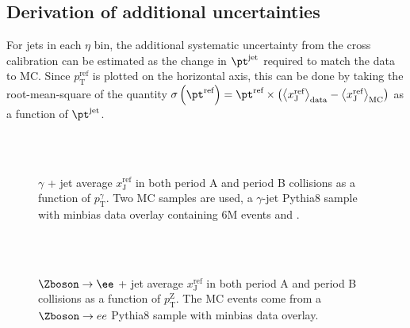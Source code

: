 \documentclass[NOTE, atlasdraft=true, texlive=2016, USenglish]{\ATLASLATEXPATH atlasdoc}
\begin{document}
\subsection{Derivation of additional uncertainties}
For jets in each $\eta$ bin, the additional systematic uncertainty from the cross calibration can be estimated as the change in $\pt^{\text{jet}}$ required to match the data to MC. Since $p_{\text{T}}^{\text{ref}}$ is plotted on the horizontal axis, this can be done by taking the root-mean-square of the quantity $\sigma \left(\pt^{\text{ref}}\right) = \pt^{\text{ref}} \times\left( \left< x_{\text{J}}^{\text{ref}} \right>_{\text{data}} - \left< x_{\text{J}}^{\text{ref}} \right>_{\text{MC}} \right)$ as a function of $\pt^{\text{jet}}$.

\begin{figure}[htbp]
	\centering
	 \\
	 \\
	\caption{$\gamma$ + jet average $x_{\text{J}}^{\text{ref}}$ in both period A and period B collisions as a function of $p_{\text{T}}^{\gamma}$. Two MC samples are used, a $\gamma$-jet Pythia8 sample with minbias data overlay containing 6M events and .}
	\label{fig:xjgammaPABDO}
\end{figure}

\begin{figure}[htbp]
	\centering
	 \\
	 \\
	\caption{$\Zboson\rightarrow\ee$ + jet average $x_{\text{J}}^{\text{ref}}$ in both period A and period B collisions as a function of $p_{\text{T}}^{\text{Z}}$. The MC events come from a $\Zboson\rightarrow ee$ Pythia8 sample with minbias data overlay.}
	\label{fig:xjzeePABDO}
\end{figure}
\end{document}

